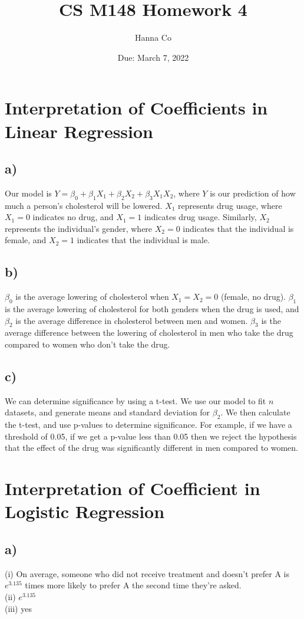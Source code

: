 \documentclass[12pt, letterpaper]{article}
\title{CS M148 Homework 4}
\author{Hanna Co}
\date{Due: March 7, 2022}
\begin{document}
\maketitle
\newpage
\section{Interpretation of Coefficients in Linear Regression}
\subsection*{a)} Our model is $Y = \beta_0 + \beta_1X_1 + \beta_2X_2 + \beta_3X_1X_2$, where $Y$ is our prediction of how much a person's cholesterol will be lowered. $X_1$ represents drug usage, where $X_1=0$ indicates no drug, and $X_1=1$ indicates drug usage. Similarly, $X_2$ represents the individual's gender, where $X_2=0$ indicates that the individual is female, and $X_2=1$ indicates that the individual is male.

\subsection*{b)} $\beta_0$ is the average lowering of cholesterol when $X_1=X_2=0$ (female, no drug). $\beta_1$  is the average lowering of cholesterol for both genders when the drug is used, and $\beta_2$ is the average difference in cholesterol between men and women. $\beta_3$ is the average difference between the lowering of cholesterol in men who take the drug compared to women who don't take the drug.

\subsection*{c)} We can determine significance by using a t-test. We use our model to fit $n$ datasets, and generate means and standard deviation for $\beta_2$. We then calculate the t-test, and use p-values to determine significance. For example, if we have a threshold of 0.05, if we get a p-value less than 0.05 then we reject the hypothesis that the effect of the drug was significantly different in men compared to women.

\newpage
\section{ Interpretation of Coefficient in Logistic Regression}
\subsection*{a)}
(i) On average, someone who did not receive treatment and doesn't prefer A is $e^{3.135}$ times more likely to prefer A the second time they're asked.\\
(ii) $e^{3.135}$\\
(iii) yes
\end{document}
